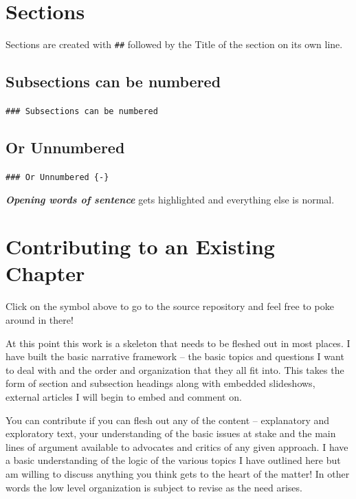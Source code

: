 \documentclass[
  12pt, openany]{book}
\makeatletter
\newenvironment{kframe}{%
\medskip{}
\setlength{\fboxsep}{.8em}
 \def\at@end@of@kframe{}%
 \ifinner\ifhmode%
  \def\at@end@of@kframe{\end{minipage}}%
  \begin{minipage}{\columnwidth}%
 \fi\fi%
 \def\FrameCommand##1{\hskip\@totalleftmargin \hskip-\fboxsep
 \colorbox{shadecolor}{##1}\hskip-\fboxsep
     \hskip-\linewidth \hskip-\@totalleftmargin \hskip\columnwidth}%
 \MakeFramed {\advance\hsize-\width
   \@totalleftmargin\z@ \linewidth\hsize
   \@setminipage}}%
 {\par\unskip\endMakeFramed%
 \at@end@of@kframe}
\newenvironment{rmdblock}[1]
  {
  \begin{itemize}
  \renewcommand{\labelitemi}{
    \raisebox{-.7\height}[0pt][0pt]{
      {\setkeys{Gin}{width=3em,keepaspectratio}\texttt{[image: img/\#1]}}
    }
  }
  \setlength{\fboxsep}{1em}
  \begin{kframe}
  \item
  }
  {
  \end{kframe}
  \end{itemize}
  }
\newenvironment{important}
  {\begin{rmdblock}{important}}
  {\end{rmdblock}}
\makeatother
\begin{document}
\hypertarget{sections}{%
\section{Sections}\label{sections}}

Sections are created with \texttt{\#\#} followed by the Title of the section on its own line.

\hypertarget{subsections-can-be-numbered}{%
\subsection{Subsections can be numbered}\label{subsections-can-be-numbered}}

\texttt{\#\#\#\ Subsections\ can\ be\ numbered}

\hypertarget{or-unnumbered}{%
\subsection*{Or Unnumbered}\label{or-unnumbered}}


\texttt{\#\#\#\ Or\ Unnumbered\ \{-\}}

\textbf{\emph{Opening words of sentence}} gets highlighted and everything else is normal.

\hypertarget{contributing-to-an-existing-chapter}{%
\section{Contributing to an Existing Chapter}\label{contributing-to-an-existing-chapter}}

\begin{important}

Click on the symbol above to go to the source repository and feel free to poke around in there!

\end{important}

At this point this work is a skeleton that needs to be fleshed out in most places. I have built the basic narrative framework -- the basic topics and questions I want to deal with and the order and organization that they all fit into. This takes the form of section and subsection headings along with embedded slideshows, external articles I will begin to embed and comment on.

You can contribute if you can flesh out any of the content -- explanatory and exploratory text, your understanding of the basic issues at stake and the main lines of argument available to advocates and critics of any given approach. I have a basic understanding of the logic of the various topics I have outlined here but am willing to discuss anything you think gets to the heart of the matter! In other words the low level organization is subject to revise as the need arises.
\end{document}
